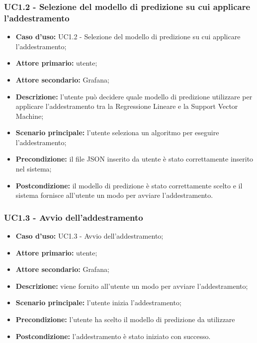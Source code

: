 \documentclass{article}
\begin{document}
	\subsubsection{UC1.2 - Selezione del modello di predizione su cui applicare l'addestramento}
	\begin{itemize}
		\item \textbf{Caso d’uso:} UC1.2 - Selezione del modello di predizione su cui applicare l'addestramento;
		\item \textbf{Attore primario:} utente;
		\item \textbf{Attore secondario:} Grafana\glo;
		\item \textbf{Descrizione:} l'utente può decidere quale modello di predizione utilizzare per applicare l'addestramento tra la Regressione Lineare e la Support Vector Machine;
		\item \textbf{Scenario principale:} l'utente seleziona un algoritmo per eseguire l'addestramento;
		\item \textbf{Precondizione:} il file JSON inserito da utente è stato correttamente inserito nel sistema;
		\item \textbf{Postcondizione:} il modello di predizione è stato correttamente scelto e il sistema fornisce all'utente un modo per avviare l'addestramento.
	\end{itemize}

	\subsubsection{UC1.3 - Avvio dell'addestramento}
	\begin{itemize}
		\item \textbf{Caso d’uso:} UC1.3 - Avvio dell'addestramento;
		\item \textbf{Attore primario:} utente;
		\item \textbf{Attore secondario:} Grafana\glo;
		\item \textbf{Descrizione:} viene fornito all'utente un modo per avviare l'addestramento;
		\item \textbf{Scenario principale:} l'utente inizia l'addestramento; 
		\item \textbf{Precondizione:} l'utente ha scelto il modello di predizione da utilizzare
		\item \textbf{Postcondizione:} l'addestramento è stato iniziato con successo.
	\end{itemize}
\end{document}
